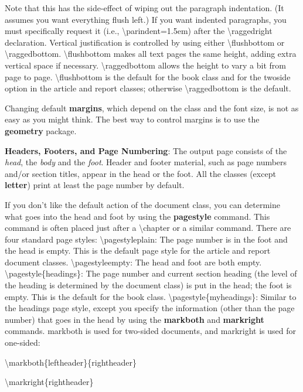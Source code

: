 \documentclass[12pt,openright]{book}
\begin{document}
Note that this has the side-effect of wiping out the paragraph indentation. (It assumes you want everything flush left.) If you want indented paragraphs, you must specifically request it (i.e., \textbackslash parindent=1.5em) after the \textbackslash raggedright declaration. Vertical justification is controlled by using either \textbackslash flushbottom or \textbackslash raggedbottom. \textbackslash flushbottom makes all text pages the same height, adding extra vertical space if necessary. \textbackslash raggedbottom allows the height to vary a bit from page to page. \textbackslash flushbottom is the default for the book class and for the twoside option in the article and report classes; otherwise \textbackslash raggedbottom is the default.

Changing default \textbf{margins}, which depend on the class and the font size, is not as easy as you might think. The best way to control margins is to use the \textbf{geometry} package.

\textbf{Headers, Footers, and Page Numbering}: The output page consists of the \textit{head}, the \textit{body} and the \textit{foot}. Header and footer material, such as page numbers and/or section titles, appear in the head or the foot. All the classes (except \textbf{letter}) print at least the page number by default.

If you don’t like the default action of the document class, you can determine what goes into the head and foot by using the \textbf{pagestyle} command. This command is often placed just after a \textbackslash chapter or a similar command. There are four standard page styles: \textbackslash pagestyle{plain}: The page number is in the foot and the head is empty. This is the default page style for the article and report document classes.  \textbackslash pagestyle{empty}: The head and foot are both empty. \textbackslash pagestyle\{headings\}: The page number and current section heading (the level of the heading is determined by the document class) is put in the head; the foot is empty. This is the default for the book class. \textbackslash pagestyle\{myheadings\}: Similar to the headings page style, except you specify the information (other than the page number) that goes in the head by using the \textbf{markboth} and \textbf{markright} commands. markboth is used for two-sided documents, and markright is used for one-sided:

\textbackslash markboth\{leftheader\}\{rightheader\}

\textbackslash markright\{rightheader\}
\end{document}
